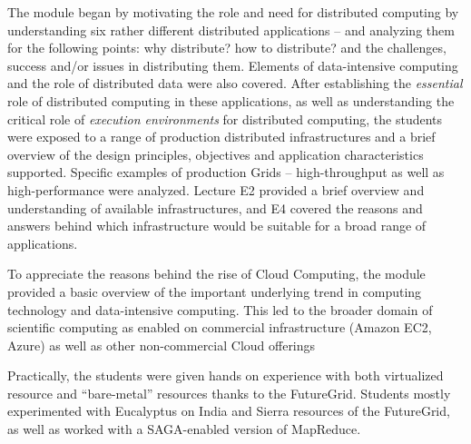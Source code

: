\documentclass[]{paper}
\begin{document}
The module began by motivating the role and need for distributed
computing by understanding six rather different distributed
applications -- and analyzing them for the following points: why
distribute? how to distribute? and the challenges, success and/or issues
in distributing them. Elements of data-intensive computing and the
role of distributed data were also covered.  After establishing the
{\it essential} role of distributed computing in these applications,
as well as understanding the critical role of {\it execution
  environments} for distributed computing, the students were exposed
to a range of production distributed infrastructures and a brief
overview of the design principles, objectives and application
characteristics supported.  Specific examples of production Grids --
high-throughput as well as high-performance were analyzed.
Lecture E2 provided a brief overview and understanding of
available infrastructures, and E4 covered the reasons and answers
behind which infrastructure would be suitable for a broad range of
applications.

To appreciate the reasons behind the rise of Cloud Computing, the
module provided a basic overview of the important underlying trend in
computing technology and data-intensive computing. This led to the
broader domain of scientific computing as enabled on commercial
infrastructure (Amazon EC2, Azure) as well as other non-commercial
Cloud offerings

 
Practically, the students were given hands on experience with both
virtualized resource and ``bare-metal'' resources thanks to the
FutureGrid. Students mostly experimented with Eucalyptus on India and
Sierra resources of the FutureGrid, as well as worked with a
SAGA-enabled version of MapReduce.
\end{document}
